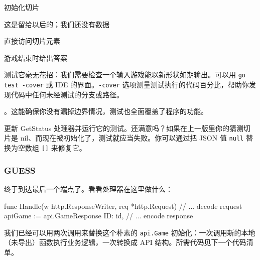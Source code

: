 \begin{codeannotations}
\item 初始化切片
\item 这是留给以后的；我们还没有数据
\item 直接访问切片元素
\item 游戏结束时给出答案
\end{codeannotations}

测试它毫无花招：我们需要检查一个输入游戏能以新形状如期输出。可以用 \texttt{go test -cover} 或 IDE 的界面。\texttt{-cover} 选项测量测试执行的代码百分比，帮助你发现代码中任何未经测试的分支或路径。

。这能确保你没有漏掉边界情况，测试也全面覆盖了程序的功能。

更新 GetStatus 处理器并运行它的测试。还满意吗？如果在上一版里你的猜测切片是 nil、而现在被初始化了，测试就应当失败。你可以通过把 JSON 值 \texttt{null} 替换为空数组 \texttt{[]} 来修复它。

\subsubsection*{GUESS}

终于到达最后一个端点了。看看处理器在这里做什么：

\begin{gocode}[]
func Handle(w http.ResponseWriter, req *http.Request) {
    // ... decode request
    apiGame := api.GameResponse{
        ID: id,
    }
    // ... encode response
}
\end{gocode}

我们已经可以用两次调用来替换这个朴素的 \texttt{api.Game} 初始化：一次调用新的本地（未导出）函数执行业务逻辑，一次转换成 API 结构。所需代码见下一个代码清单。


